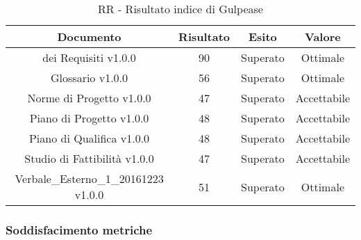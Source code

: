 \begin{table}[h]
	\begin{center}
		\begin{tabular}{|c|c|c|c|}
			\hline
			\textbf{Documento}	& \textbf{Risultato} & \textbf{Esito} & \textbf{Valore} \\
			\hline
		 \termine{Analisi} dei Requisiti v1.0.0 & 90 & Superato & Ottimale	\\
			\hline
			Glossario v1.0.0 & 56 & Superato & Ottimale	\\
			\hline
			Norme di Progetto v1.0.0 & 47 & Superato & Accettabile \\
			\hline
			Piano di Progetto v1.0.0 & 48 & Superato & Accettabile\\
			\hline
			Piano di Qualifica v1.0.0	& 48 & Superato & Accettabile\\
			\hline
			Studio di Fattibilità v1.0.0	& 47 & Superato & Accettabile\\
			\hline
			Verbale\_Esterno\_1\_20161223 v1.0.0	& 51 & Superato & Ottimale	\\
			\hline
		\end{tabular}
	\end{center}
	\caption{RR - Risultato indice di Gulpease}
\end{table}

\subsubsection{Soddisfacimento metriche}

